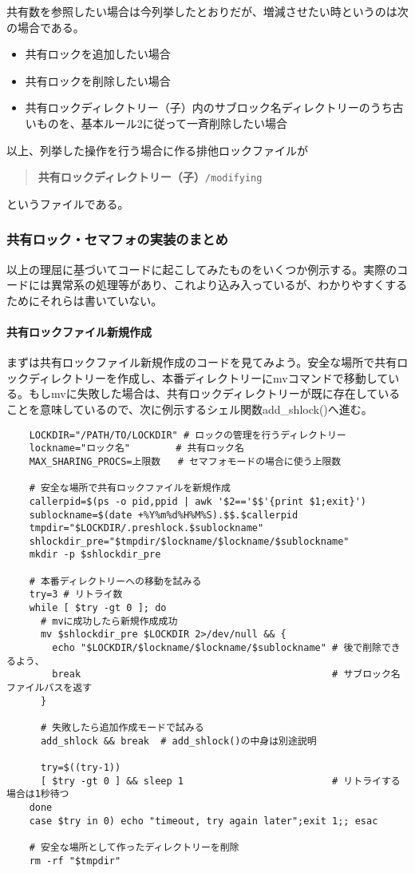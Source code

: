 共有数を参照したい場合は今列挙したとおりだが、増減させたい時というのは次の場合である。
\begin{itemize}
  \item 共有ロックを追加したい場合
  \item 共有ロックを削除したい場合
  \item 共有ロックディレクトリー（子）内のサブロック名ディレクトリーのうち古いものを、基本ルール2に従って一斉削除したい場合
\end{itemize}
以上、列挙した操作を行う場合に作る排他ロックファイルが
\begin{quotation}
	\noindent
	\textbf{共有ロックディレクトリー（子）}\verb|/modifying|
\end{quotation}
というファイルである。

\subsubsection*{共有ロック・セマフォの実装のまとめ}
以上の理屈に基づいてコードに起こしてみたものをいくつか例示する。実際のコードには異常系の処理等があり、これより込み入っているが、わかりやすくするためにそれらは書いていない。

\paragraph{共有ロックファイル新規作成}
まずは共有ロックファイル新規作成のコードを見てみよう。安全な場所で共有ロックディレクトリーを作成し、本番ディレクトリーにmvコマンドで移動している。もしmvに失敗した場合は、共有ロックディレクトリーが既に存在していることを意味しているので、次に例示するシェル関数add\_{}shlock()へ進む。\\
\begin{frameboxit}{160.0mm}
\begin{verbatim}
	LOCKDIR="/PATH/TO/LOCKDIR" # ロックの管理を行うディレクトリー
	lockname="ロック名"        # 共有ロック名
	MAX_SHARING_PROCS=上限数   # セマフォモードの場合に使う上限数

	# 安全な場所で共有ロックファイルを新規作成
	callerpid=$(ps -o pid,ppid | awk '$2=='$$'{print $1;exit}')
	sublockname=$(date +%Y%m%d%H%M%S).$$.$callerpid
	tmpdir="$LOCKDIR/.preshlock.$sublockname"
	shlockdir_pre="$tmpdir/$lockname/$lockname/$sublockname"
	mkdir -p $shlockdir_pre

	# 本番ディレクトリーへの移動を試みる
	try=3 # リトライ数
	while [ $try -gt 0 ]; do
	  # mvに成功したら新規作成成功
	  mv $shlockdir_pre $LOCKDIR 2>/dev/null && {
	    echo "$LOCKDIR/$lockname/$lockname/$sublockname" # 後で削除できるよう、
	    break                                            # サブロック名ファイルパスを返す
	  }

	  # 失敗したら追加作成モードで試みる
	  add_shlock && break  # add_shlock()の中身は別途説明

	  try=$((try-1))
	  [ $try -gt 0 ] && sleep 1                          # リトライする場合は1秒待つ
	done
	case $try in 0) echo "timeout, try again later";exit 1;; esac

	# 安全な場所として作ったディレクトリーを削除
	rm -rf "$tmpdir"
\end{verbatim}
\end{frameboxit}

